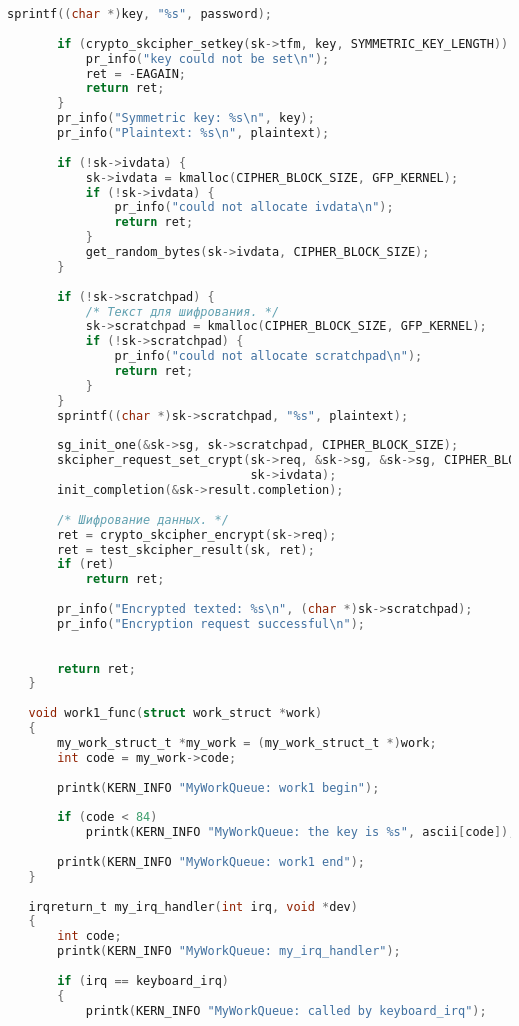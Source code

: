 \begin{lstlisting}[language=c, label=rudakov-menya-ne-spaset, caption=Загружаемый модуль ядра]
       sprintf((char *)key, "%s", password);
    
       if (crypto_skcipher_setkey(sk->tfm, key, SYMMETRIC_KEY_LENGTH)) {
           pr_info("key could not be set\n");
           ret = -EAGAIN;
           return ret;
       }
       pr_info("Symmetric key: %s\n", key);
       pr_info("Plaintext: %s\n", plaintext);
    
       if (!sk->ivdata) {
           sk->ivdata = kmalloc(CIPHER_BLOCK_SIZE, GFP_KERNEL);
           if (!sk->ivdata) {
               pr_info("could not allocate ivdata\n");
               return ret;
           }
           get_random_bytes(sk->ivdata, CIPHER_BLOCK_SIZE);
       }
    
       if (!sk->scratchpad) {
           /* Текст для шифрования. */
           sk->scratchpad = kmalloc(CIPHER_BLOCK_SIZE, GFP_KERNEL);
           if (!sk->scratchpad) {
               pr_info("could not allocate scratchpad\n");
               return ret;
           }
       }
       sprintf((char *)sk->scratchpad, "%s", plaintext);
    
       sg_init_one(&sk->sg, sk->scratchpad, CIPHER_BLOCK_SIZE);
       skcipher_request_set_crypt(sk->req, &sk->sg, &sk->sg, CIPHER_BLOCK_SIZE,
                                  sk->ivdata);
       init_completion(&sk->result.completion);
    
       /* Шифрование данных. */
       ret = crypto_skcipher_encrypt(sk->req);
       ret = test_skcipher_result(sk, ret);
       if (ret)
           return ret;
       
       pr_info("Encrypted texted: %s\n", (char *)sk->scratchpad);
       pr_info("Encryption request successful\n");
    
   
       return ret;
   }
    
   void work1_func(struct work_struct *work)
   {
       my_work_struct_t *my_work = (my_work_struct_t *)work;
       int code = my_work->code;
   
       printk(KERN_INFO "MyWorkQueue: work1 begin");
   
       if (code < 84)
           printk(KERN_INFO "MyWorkQueue: the key is %s", ascii[code]);
   
       printk(KERN_INFO "MyWorkQueue: work1 end");
   }
   
   irqreturn_t my_irq_handler(int irq, void *dev)
   {
       int code;
       printk(KERN_INFO "MyWorkQueue: my_irq_handler");
   
       if (irq == keyboard_irq)
       {
           printk(KERN_INFO "MyWorkQueue: called by keyboard_irq");
   

\end{lstlisting}
